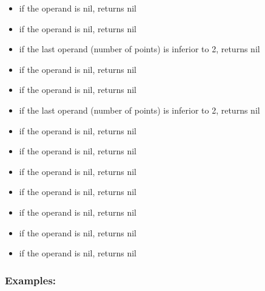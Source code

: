 \documentclass[]{book}
\providecommand{\tightlist}{%
  \setlength{\itemsep}{0pt}\setlength{\parskip}{0pt}}
\theoremstyle{definition}
\theoremstyle{definition}
\theoremstyle{definition}
\theoremstyle{remark}
\begin{document}
\begin{itemize}
\tightlist
\item
  if the operand is nil, returns nil\\
\item
  if the operand is nil, returns nil\\
\item
  if the last operand (number of points) is inferior to 2, returns nil\\
\item
  if the operand is nil, returns nil\\
\item
  if the operand is nil, returns nil\\
\item
  if the last operand (number of points) is inferior to 2, returns nil\\
\item
  if the operand is nil, returns nil\\
\item
  if the operand is nil, returns nil\\
\item
  if the operand is nil, returns nil\\
\item
  if the operand is nil, returns nil\\
\item
  if the operand is nil, returns nil\\
\item
  if the operand is nil, returns nil\\
\item
  if the operand is nil, returns nil
\end{itemize}

\subsubsection{Examples:}\label{examples-92}
\end{document}

